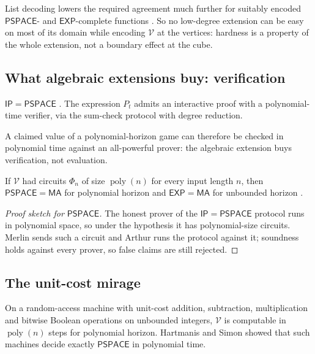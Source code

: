 \documentclass[final]{siamart0516}
\numberwithin{theorem}{section}
\numberwithin{equation}{section}
\theoremstyle{siamnonum}
\theoremstyle{plain}
\newcommand{\val}{\mathcal{V}}            %
\newcommand{\poly}{\operatorname{poly}}
\newcommand{\cls}[1]{\mathsf{#1}}
\newcommand{\PSPACE}{\cls{PSPACE}}
\newcommand{\EXP}{\cls{EXP}}
\newcommand{\MA}{\cls{MA}}
\newcommand{\IP}{\cls{IP}}
\begin{document}
List decoding lowers the required agreement much further for suitably encoded $\PSPACE$- and $\EXP$-complete functions \cite{STV,TrevisanVadhan}. So no low-degree extension can be easy on most of its domain while encoding $\val$ at the vertices: hardness is a property of the whole extension, not a boundary effect at the cube.

\subsection{What algebraic extensions buy: verification}
\begin{theorem}\label{thm:ip}
$\IP=\PSPACE$ \cite{LFKN,Shamir}. The expression $P_t$ admits an interactive proof with a polynomial-time verifier, via the sum-check protocol with degree reduction.
\end{theorem}
A claimed value of a polynomial-horizon game can therefore be checked in polynomial time against an all-powerful prover: the algebraic extension buys verification, not evaluation.

\begin{corollary}\label{cor:nonuniform}
If $\val$ had circuits $\Phi_n$ of size $\poly(n)$ for every input length $n$, then $\PSPACE=\MA$ for polynomial horizon and $\EXP=\MA$ for unbounded horizon \cite{BFNW}.
\end{corollary}
\begin{proof}[Proof sketch for $\PSPACE$]
The honest prover of the $\IP=\PSPACE$ protocol runs in polynomial space, so under the hypothesis it has polynomial-size circuits. Merlin sends such a circuit and Arthur runs the protocol against it; soundness holds against every prover, so false claims are still rejected.
\end{proof}

\subsection{The unit-cost mirage}
\begin{theorem}\label{thm:unit-cost}
On a random-access machine with unit-cost addition, subtraction, multiplication and bitwise Boolean operations on unbounded integers, $\val$ is computable in $\poly(n)$ steps for polynomial horizon. Hartmanis and Simon \cite{HartmanisSimon} showed that such machines decide exactly $\PSPACE$ in polynomial time.
\end{theorem}
\end{document}
